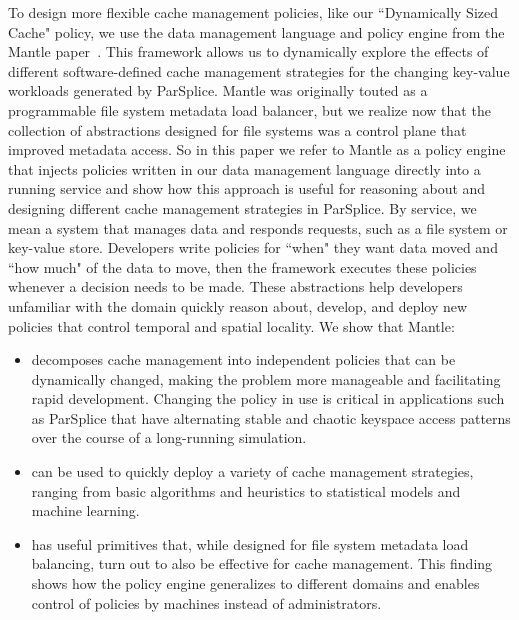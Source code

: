 To design more flexible cache management policies, like our ``Dynamically
Sized Cache" policy, we use the data management language and policy engine
from the Mantle paper~\cite{sevilla:sc15-mantle}. This framework allows us to
dynamically explore the effects of different software-defined cache management
strategies for the changing key-value workloads generated by ParSplice.  Mantle
was originally touted as a programmable file system metadata load balancer, but
we realize now that the collection of abstractions designed for file systems
was a control plane that improved metadata access. So in this paper we refer to
Mantle as a policy engine that injects policies written in our data management
language directly into a running service and show how this approach is useful
for reasoning about and designing different cache management strategies in
ParSplice.  By service, we mean a system that manages data and responds
requests, such as a file system or key-value store.  Developers write policies
for ``when" they want data moved and ``how much" of the data to move, then the
framework executes these policies whenever a decision needs to be made.  These
abstractions help developers unfamiliar with the domain quickly reason about,
develop, and deploy new policies that control temporal and spatial locality. We
show that Mantle:

\begin{itemize}

  \item decomposes cache management into independent policies that can be
  dynamically changed, making the problem more manageable and facilitating rapid
  development. Changing the policy in use is critical in applications such as
  ParSplice that have alternating stable and chaotic keyspace access patterns
  over the course of a long-running simulation.  

  \item can be used to quickly deploy a variety of cache management strategies,
  ranging from basic algorithms and heuristics to statistical models and machine
  learning.

  \item has useful primitives that, while designed for file system metadata
  load balancing, turn out to also be effective for cache management. This
  finding shows how the policy engine generalizes to different domains and
  enables control of policies by machines instead of administrators.

\end{itemize}

